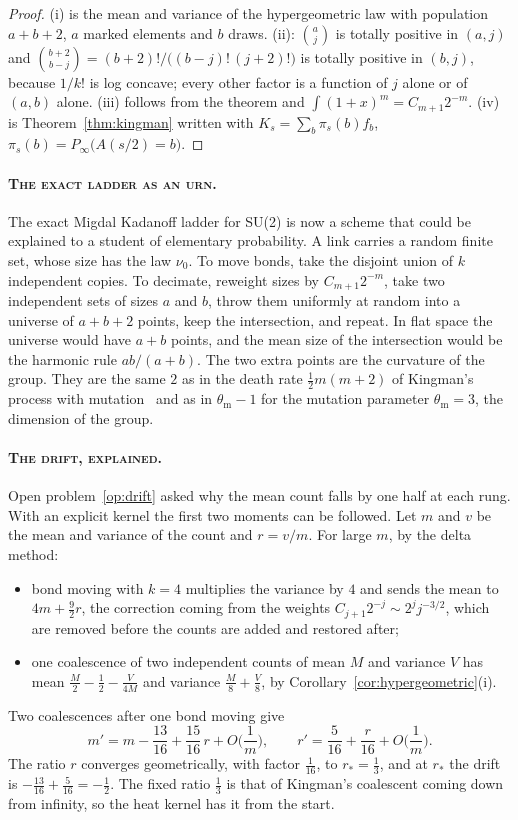 \begin{proof}
(i) is the mean and variance of the hypergeometric law with population $a+b+2$, $a$ marked elements and $b$ draws. (ii): $\binom aj$ is totally positive in $(a,j)$ and $\binom{b+2}{b-j}=(b+2)!/\big((b-j)!\,(j+2)!\big)$ is totally positive in $(b,j)$, because $1/k!$ is log concave; every other factor is a function of $j$ alone or of $(a,b)$ alone. (iii) follows from the theorem and $\int(1+x)^m=C_{m+1}2^{-m}$. (iv) is Theorem~\ref{thm:kingman} written with $K_s=\sum_b\pi_s(b)f_b$, $\pi_s(b)=P_\infty\big(A(s/2)=b\big)$.
\end{proof}

\paragraph{\normalfont\scshape The exact ladder as an urn.} The exact Migdal Kadanoff ladder for SU(2) is now a scheme that could be explained to a student of elementary probability. A link carries a random finite set, whose size has the law $\nu_0$. To move bonds, take the disjoint union of $k$ independent copies. To decimate, reweight sizes by $C_{m+1}2^{-m}$, take two independent sets of sizes $a$ and $b$, throw them uniformly at random into a universe of $a+b+2$ points, keep the intersection, and repeat. In flat space the universe would have $a+b$ points, and the mean size of the intersection would be the harmonic rule $ab/(a+b)$. The two extra points are the curvature of the group. They are the same $2$ as in the death rate $\frac12m(m+2)$ of Kingman's process with mutation~\cite{Gri80,Tav84} and as in $\theta_{\mathrm m}-1$ for the mutation parameter $\theta_{\mathrm m}=3$, the dimension of the group.

\paragraph{\normalfont\scshape The drift, explained.} Open problem~\ref{op:drift} asked why the mean count falls by one half at each rung. With an explicit kernel the first two moments can be followed. Let $m$ and $v$ be the mean and variance of the count and $r=v/m$. For large $m$, by the delta method:
\begin{itemize}
\item bond moving with $k=4$ multiplies the variance by $4$ and sends the mean to $4m+\frac92r$, the correction coming from the weights $C_{j+1}2^{-j}\sim2^jj^{-3/2}$, which are removed before the counts are added and restored after;
\item one coalescence of two independent counts of mean $M$ and variance $V$ has mean $\frac M2-\frac12-\frac V{4M}$ and variance $\frac M8+\frac V8$, by Corollary~\ref{cor:hypergeometric}(i).
\end{itemize}
Two coalescences after one bond moving give
\[
m'=m-\frac{13}{16}+\frac{15}{16}\,r+O\Big(\frac1m\Big),\qquad r'=\frac5{16}+\frac r{16}+O\Big(\frac1m\Big).
\]
The ratio $r$ converges geometrically, with factor $\frac1{16}$, to $r_*=\frac13$, and at $r_*$ the drift is $-\frac{13}{16}+\frac5{16}=-\frac12$. The fixed ratio $\frac13$ is that of Kingman's coalescent coming down from infinity, so the heat kernel has it from the start.

